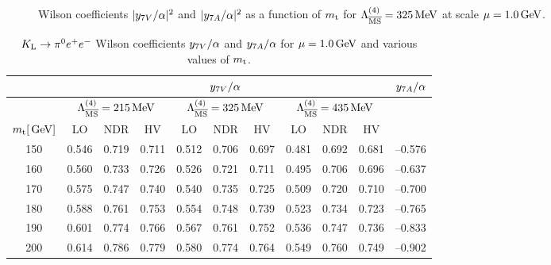 \begin{figure}[hbt]
\vspace{0.10in}
\centerline{
\epsfysize=5in
 }
\vspace{0.08in}
\caption[]{
Wilson coefficients $|y_{7V}/\alpha|^2$ and $|y_{7A}/\alpha|^2$ as a
function of $m_{\rm t}$ for $\Lambda_{\overline{\rm MS}}^{(4)}=325\, {\rm MeV}$ at scale $\mu=1.0\, {\rm GeV}$.
\label{fig:kpiee:mty7VA}}
\end{figure}

\begin{table}[htb]
\caption[]{$K_{\rm L} \to \pi^0 e^+ e^-$ Wilson coefficients
$y_{7V}/\alpha$ and $y_{7A}/\alpha$ for $\mu=1.0\, {\rm GeV}$ and various values of
$m_{\rm t}$.
\label{tab:kpey7VAmt}}
\begin{center}
\begin{tabular}{|c|c|c|c||c|c|c||c|c|c||c|}
& \multicolumn{9}{c||}{$y_{7V}/\alpha$} & $y_{7A}/\alpha$ \\
\hline
& \multicolumn{3}{c||}{$\Lambda_{\overline{\rm MS}}^{(4)}=215\, {\rm MeV}$} &
  \multicolumn{3}{c||}{$\Lambda_{\overline{\rm MS}}^{(4)}=325\, {\rm MeV}$} &
  \multicolumn{3}{c||}{$\Lambda_{\overline{\rm MS}}^{(4)}=435\, {\rm MeV}$} & \\
\hline
$m_{\rm t} [\, {\rm GeV}]$ & LO & NDR & HV & LO & NDR & HV & LO & NDR & HV & \\
\hline
150 & 0.546 & 0.719 & 0.711 & 0.512 & 
0.706 & 0.697 & 0.481 & 0.692 & 0.681 & --0.576 \\
160 & 0.560 & 0.733 & 0.726 & 0.526 & 
0.721 & 0.711 & 0.495 & 0.706 & 0.696 & --0.637 \\
170 & 0.575 & 0.747 & 0.740 & 0.540 & 
0.735 & 0.725 & 0.509 & 0.720 & 0.710 & --0.700 \\
180 & 0.588 & 0.761 & 0.753 & 0.554 & 
0.748 & 0.739 & 0.523 & 0.734 & 0.723 & --0.765 \\
190 & 0.601 & 0.774 & 0.766 & 0.567 & 
0.761 & 0.752 & 0.536 & 0.747 & 0.736 & --0.833 \\
200 & 0.614 & 0.786 & 0.779 & 0.580 & 
0.774 & 0.764 & 0.549 & 0.760 & 0.749 & --0.902 \\
\end{tabular}
\end{center}
\end{table}
